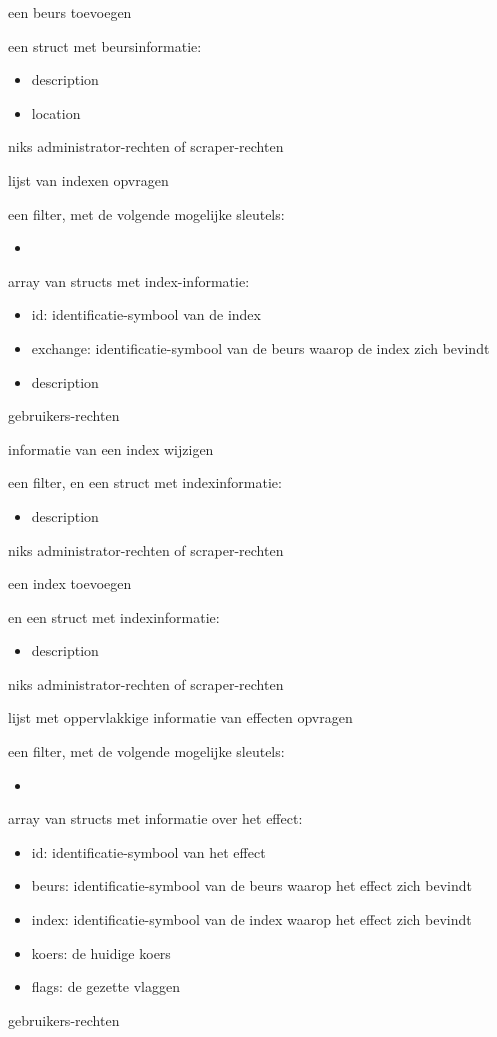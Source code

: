 	{ een beurs toevoegen }
	{ een struct met beursinformatie:
		\begin{itemize}
		\item{description}
		\item{location}
		\end{itemize} }
	{ niks }
	{ administrator-rechten of scraper-rechten }

	{ lijst van indexen opvragen }
	{ een filter, met de volgende mogelijke sleutels:
		\begin{itemize}
		\item{}
		\end{itemize} }
	{ array van structs met index-informatie:
		\begin{itemize}
		\item{id: identificatie-symbool van de index}
		\item{exchange: identificatie-symbool van de beurs waarop de index zich bevindt}
		\item{description}
		\end{itemize} }
	{ gebruikers-rechten }

	{ informatie van een index wijzigen }
	{ een filter, en een struct met indexinformatie:
		\begin{itemize}
		\item{description}
		\end{itemize} }
	{ niks }
	{ administrator-rechten of scraper-rechten }

	{ een index toevoegen }
	{ en een struct met indexinformatie:
		\begin{itemize}
		\item{description}
		\end{itemize} }
	{ niks }
	{ administrator-rechten of scraper-rechten }

	{ lijst met oppervlakkige informatie van effecten opvragen }
	{ een filter, met de volgende mogelijke sleutels:
		\begin{itemize}
		\item{}
		\end{itemize} }
	{ array van structs met informatie over het effect:
		\begin{itemize}
		\item{id: identificatie-symbool van het effect}
		\item{beurs: identificatie-symbool van de beurs waarop het effect zich bevindt}
		\item{index: identificatie-symbool van de index waarop het effect zich bevindt}
		\item{koers: de huidige koers}
		\item{flags: de gezette vlaggen}
		\end{itemize} }
	{ gebruikers-rechten }

